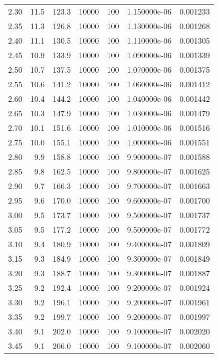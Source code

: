 \begin{tabular}{rrrrrrr}
  2.30 &     11.5 &    123.3 & 10000 & 100 & 1.150000e-06 & 0.001233 \\
  2.35 &     11.3 &    126.8 & 10000 & 100 & 1.130000e-06 & 0.001268 \\
  2.40 &     11.1 &    130.5 & 10000 & 100 & 1.110000e-06 & 0.001305 \\
  2.45 &     10.9 &    133.9 & 10000 & 100 & 1.090000e-06 & 0.001339 \\
  2.50 &     10.7 &    137.5 & 10000 & 100 & 1.070000e-06 & 0.001375 \\
  2.55 &     10.6 &    141.2 & 10000 & 100 & 1.060000e-06 & 0.001412 \\
  2.60 &     10.4 &    144.2 & 10000 & 100 & 1.040000e-06 & 0.001442 \\
  2.65 &     10.3 &    147.9 & 10000 & 100 & 1.030000e-06 & 0.001479 \\
  2.70 &     10.1 &    151.6 & 10000 & 100 & 1.010000e-06 & 0.001516 \\
  2.75 &     10.0 &    155.1 & 10000 & 100 & 1.000000e-06 & 0.001551 \\
  2.80 &      9.9 &    158.8 & 10000 & 100 & 9.900000e-07 & 0.001588 \\
  2.85 &      9.8 &    162.5 & 10000 & 100 & 9.800000e-07 & 0.001625 \\
  2.90 &      9.7 &    166.3 & 10000 & 100 & 9.700000e-07 & 0.001663 \\
  2.95 &      9.6 &    170.0 & 10000 & 100 & 9.600000e-07 & 0.001700 \\
  3.00 &      9.5 &    173.7 & 10000 & 100 & 9.500000e-07 & 0.001737 \\
  3.05 &      9.5 &    177.2 & 10000 & 100 & 9.500000e-07 & 0.001772 \\
  3.10 &      9.4 &    180.9 & 10000 & 100 & 9.400000e-07 & 0.001809 \\
  3.15 &      9.3 &    184.9 & 10000 & 100 & 9.300000e-07 & 0.001849 \\
  3.20 &      9.3 &    188.7 & 10000 & 100 & 9.300000e-07 & 0.001887 \\
  3.25 &      9.2 &    192.4 & 10000 & 100 & 9.200000e-07 & 0.001924 \\
  3.30 &      9.2 &    196.1 & 10000 & 100 & 9.200000e-07 & 0.001961 \\
  3.35 &      9.2 &    199.7 & 10000 & 100 & 9.200000e-07 & 0.001997 \\
  3.40 &      9.1 &    202.0 & 10000 & 100 & 9.100000e-07 & 0.002020 \\
  3.45 &      9.1 &    206.0 & 10000 & 100 & 9.100000e-07 & 0.002060 \\

\end{tabular}
